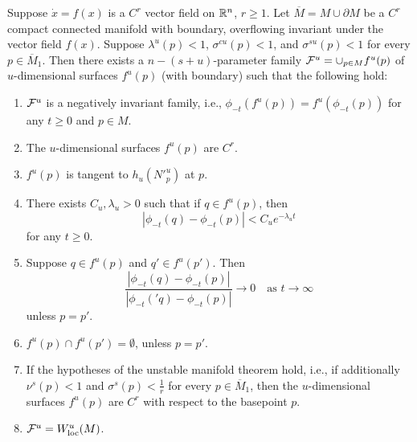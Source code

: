 \begin{theorem}
	Suppose \(\dot x = f(x) \) is a \(C^r\) vector field on \(\mathbb{R}^n\), \(r\geq 1\). Let \(\overline M = M \cup \partial M\) be a \(C^r\) compact connected manifold with boundary, overflowing invariant under the vector field \(f(x)\). Suppose \(\lambda^u(p)< 1\), \(\sigma^{cu}(p) < 1\), and \(\sigma^{su}(p) < 1\) for every \(p \in \overline M_1\). Then there exists a \(n-(s+u)\)-parameter family \(\mathcal{F}^u = \cup_{p\in M} f^u(p)\) of \(u\)-dimensional surfaces \(f^u(p)\) (with boundary) such that the following hold:
	\begin{enumerate}
		\item \(\mathcal{F}^u\) is a negatively invariant family, i.e., \(\phi_{-t} (f^u(p)) = f^u(\phi_{-t}(p))\) for any \(t\geq 0\) and \(p\in M\).
		\item The \(u\)-dimensional surfaces \(f^u(p)\) are \(C^r\).
		\item \(f^u(p)\) is tangent to \(h_u(N'^u_p)\) at \(p\).
		\item There exists \(C_u,\lambda_u > 0\) such that if \(q\in f^u(p)\), then \[| \phi_{-t}(q) - \phi_{-t}(p) | < C_u e^{-\lambda_u t}\] for any \(t\geq 0\).
		\item Suppose \(q\in f^u(p)\) and \(q'\in f^u(p')\). Then \[\frac{|\phi_{-t}(q) - \phi_{-t}(p) |}{| \phi_{-t}('q) - \phi_{-t}(p) |} \to 0 \quad \text{as } t\to\infty\] unless \(p = p'\).
		\item \(f^u(p) \cap f^u(p') = \emptyset \), unless \(p=p'\).
		\item If the hypotheses of the unstable manifold theorem hold, i.e., if additionally \(\nu^s(p) < 1\) and \(\sigma^s(p) < \frac 1 r\) for every \(p \in \overline M_1\), then the \(u\)-dimensional surfaces \(f^u(p)\) are \(C^r\) with respect to the basepoint \(p\).
		\item \(\mathcal{F}^u = W_{\mathrm{loc}}^u(M)\).
	\end{enumerate}
\end{theorem}
